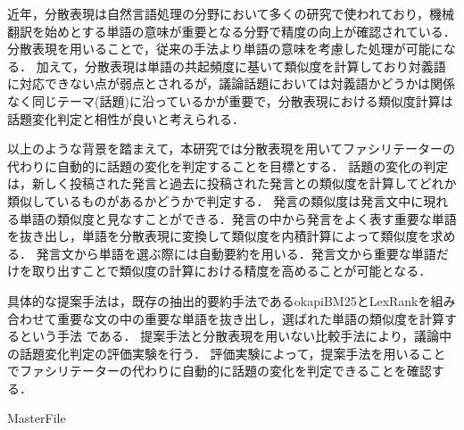 近年，分散表現は自然言語処理の分野において多くの研究で使われており，機械翻訳を始めとする単語の意味が重要となる分野で精度の向上が確認されている．分散表現を用いることで，従来の手法より単語の意味を考慮した処理が可能になる．
加えて，分散表現は単語の共起頻度に基いて類似度を計算しており対義語に対応できない点が弱点とされるが，議論話題においては対義語かどうかは関係なく同じテーマ(話題)に沿っているかが重要で，分散表現における類似度計算は話題変化判定と相性が良いと考えられる．

以上のような背景を踏まえて，本研究では分散表現を用いてファシリテーターの代わりに自動的に話題の変化を判定することを目標とする．
話題の変化の判定は，新しく投稿された発言と過去に投稿された発言との類似度を計算してどれか類似しているものがあるかどうかで判定する．
発言の類似度は発言文中に現れる単語の類似度と見なすことができる．発言の中から発言をよく表す重要な単語を抜き出し，単語を分散表現に変換して類似度を内積計算によって類似度を求める．
%
発言文から単語を選ぶ際には自動要約を用いる．発言文から重要な単語だけを取り出すことで類似度の計算における精度を高めることが可能となる．

具体的な提案手法は，既存の抽出的要約手法であるokapiBM25とLexRankを組み合わせて重要な文の中の重要な単語を抜き出し，選ばれた単語の類似度を計算するという手法
である．
提案手法と分散表現を用いない比較手法により，議論中の話題変化判定の評価実験を行う．
評価実験によって，提案手法を用いることでファシリテーターの代わりに自動的に話題の変化を判定できることを確認する．%
%
 \begin{comment}
大規模な議論では意見を共有することは可能であるが，議論を整理させることや収束させることは難しい．以上から大規模意見集約システムCOLLAGREEが開発された．本システムではWeb上で適切に大規模な議論を行うことができるように議論をマネジメントするファシリテーターを導入した．
過去の実験ではファシリテーターの存在が議論の集約に大きな役割を果たしていることが認識されており，大規模な議論のためにファシリテータは必要である．しかし，議論の規模に伴って議論時間が長くなる傾向があり，同時にファシリテーターは常に議論の動向を見続ける必要がある．故に，議論の規模が大きくなればなるほどファシリテーターは長時間かつ大規模な議論の動向の監視によって大きな負担がかかる．大規模な議論が増加する傾向を踏まえるとファシリテーターにかかる負担を軽減する支援が必要となることは明白である．
また，近年自然言語処理の分野において分散表現が多くの研究で使われており，機械翻訳を始めとする複数の分野で精度の向上が確認されている．まだ適応されていない分野でも結果の向上が期待できる．
従って，本研究では負担軽減の１つとして分散表現を用いて議論中での話題の変化を人間の代わりに検知することでファシリテーターの負担を軽減することを目指す．
\end{comment}
\expandafter\ifx\csname MasterFile\endcsname\relax

\fi
